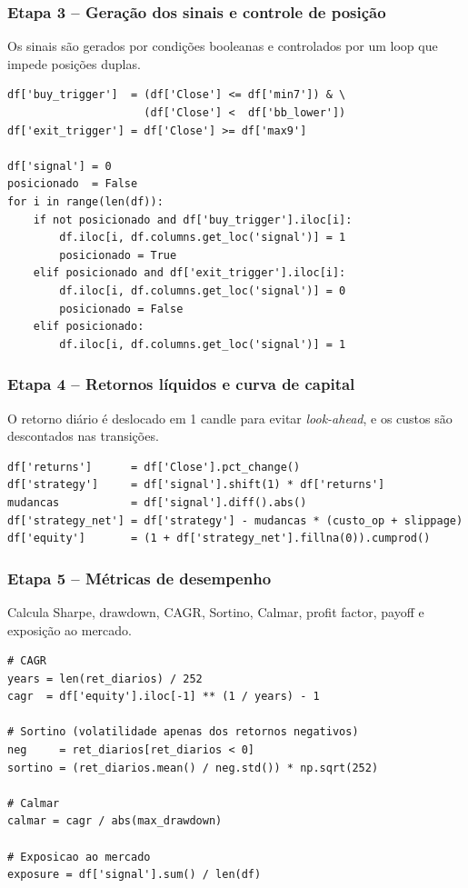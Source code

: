 \documentclass[a4paper,10pt]{article}
\begin{document}
\subsubsection*{Etapa 3 -- Geração dos sinais e controle de posição}

Os sinais são gerados por condições booleanas e controlados por um loop que impede posições duplas.

\begin{lstlisting}[caption={Geração dos sinais e loop de controle de posição.}]
df['buy_trigger']  = (df['Close'] <= df['min7']) & \
                     (df['Close'] <  df['bb_lower'])
df['exit_trigger'] = df['Close'] >= df['max9']

df['signal'] = 0
posicionado  = False
for i in range(len(df)):
    if not posicionado and df['buy_trigger'].iloc[i]:
        df.iloc[i, df.columns.get_loc('signal')] = 1
        posicionado = True
    elif posicionado and df['exit_trigger'].iloc[i]:
        df.iloc[i, df.columns.get_loc('signal')] = 0
        posicionado = False
    elif posicionado:
        df.iloc[i, df.columns.get_loc('signal')] = 1
\end{lstlisting}

\subsubsection*{Etapa 4 -- Retornos líquidos e curva de capital}

O retorno diário é deslocado em 1 candle para evitar \textit{look-ahead}, e os custos são descontados nas transições.

\begin{lstlisting}[caption={Cálculo dos retornos líquidos e curva de capital.}]
df['returns']      = df['Close'].pct_change()
df['strategy']     = df['signal'].shift(1) * df['returns']
mudancas           = df['signal'].diff().abs()
df['strategy_net'] = df['strategy'] - mudancas * (custo_op + slippage)
df['equity']       = (1 + df['strategy_net'].fillna(0)).cumprod()
\end{lstlisting}

\subsubsection*{Etapa 5 -- Métricas de desempenho}

Calcula Sharpe, drawdown, CAGR, Sortino, Calmar, profit factor, payoff e exposição ao mercado.

\begin{lstlisting}[caption={Métricas de desempenho (seleção).}]
# CAGR
years = len(ret_diarios) / 252
cagr  = df['equity'].iloc[-1] ** (1 / years) - 1

# Sortino (volatilidade apenas dos retornos negativos)
neg     = ret_diarios[ret_diarios < 0]
sortino = (ret_diarios.mean() / neg.std()) * np.sqrt(252)

# Calmar
calmar = cagr / abs(max_drawdown)

# Exposicao ao mercado
exposure = df['signal'].sum() / len(df)
\end{lstlisting}
\end{document}
